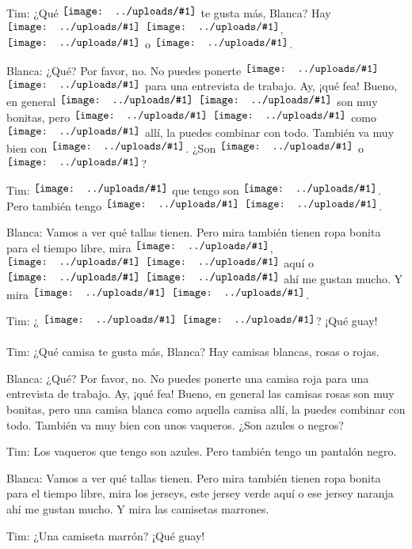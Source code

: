 \documentclass[12pt,a4paper]{scrartcl}
\newcommand{\wimgup}[1]{\begin{tikzpicture} \draw (0, 0) node[inner sep=0] {\texttt{[image: ../uploads/\#1]}};\end{tikzpicture}}
\begin{document}
	\vspace*{\fill}
	\Large
	Tim: ¿Qué  $\wimgup{php222F} $ te gusta más,  Blanca? Hay  $\wimgup{php222F} $  $\wimgup{white} $,  $\wimgup{pink} $ o  $\wimgup{red} $.
	
 Blanca: ¿Qué? Por favor, no. No puedes ponerte    $\wimgup{php222F} $  $\wimgup{red} $ para  una entrevista de trabajo. Ay, ¡qué fea! Bueno, en general    $\wimgup{php222F} $  $\wimgup{pink} $ son muy bonitas, pero    $\wimgup{php222F} $  $\wimgup{white} $ como    $\wimgup{php222F} $ allí, la puedes combinar con todo. También va muy bien con    $\wimgup{phpFB71} $. ¿Son  $\wimgup{blue} $ o  $\wimgup{black} $?

Tim:    $\wimgup{phpFB71} $ que tengo son  $\wimgup{blue} $. Pero también tengo    $\wimgup{phpE4C9} $  $\wimgup{black} $.

 Blanca: Vamos a ver qué tallas tienen. Pero mira también tienen ropa bonita para el tiempo libre, mira    $\wimgup{phpFB28} $,    $\wimgup{php371F} $  $\wimgup{green} $ aquí o    $\wimgup{php371F} $  $\wimgup{orange} $ ahí me gustan mucho. Y mira    $\wimgup{phpEA0C} $  $\wimgup{brown} $.



Tim: ¿   $\wimgup{phpEA0C} $  $\wimgup{brown} $? ¡Qué guay!
 \\ \vspace*{\fill} \pagebreak \vspace*{\fill} 
 \\  
Tim: ¿Qué camisa te gusta más, Blanca? Hay camisas blancas, rosas o rojas.

Blanca: ¿Qué? Por favor, no. No puedes ponerte una camisa roja para una entrevista de trabajo. Ay, ¡qué fea! Bueno, en general las camisas rosas son muy bonitas, pero una camisa blanca como aquella camisa allí, la puedes combinar con todo. También va muy bien con unos vaqueros. ¿Son azules o negros?

Tim: Los vaqueros que tengo son azules. Pero también tengo un pantalón negro.

Blanca: Vamos a ver qué tallas tienen. Pero mira también tienen ropa bonita para el tiempo libre, mira los jerseys, este jersey verde aquí o ese jersey naranja ahí me gustan mucho. Y mira las camisetas marrones.



Tim: ¿Una camiseta marrón? ¡Qué guay!
\vspace*{\fill}
\end{document}
